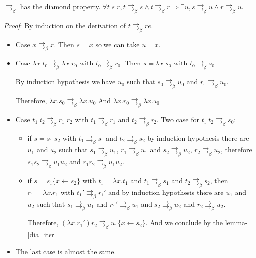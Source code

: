   \lemma $\rightrightarrows_\beta$ has the diamond property.
    $\forall t\; s\; r, t \rightrightarrows_\beta s \wedge t \rightrightarrows_\beta
    r \Rightarrow \exists u, s \rightrightarrows_\beta u \wedge r
    \rightrightarrows_\beta u$.

  \textit{Proof}: By induction on the derivation of $t\rightrightarrows_\beta
  re$.

  \begin{itemize}
    \item Case $x \rightrightarrows_\beta x$. Then $s = x$ so we can take $u =
      x$.

    \item Case $\lambda x.t_0 \rightrightarrows_\beta \lambda x. r_0$ with
      $t_0 \rightrightarrows_\beta r_0$. Then $s = \lambda x. s_0$ with
      $t_0 \rightrightarrows_\beta s_0$.

      By induction hypothesis we have $u_0$ such that $s_0
      \rightrightarrows_\beta u_0$ and $r_0 \rightrightarrows_\beta u_0$.

      Therefore, $\lambda x. s_0 \rightrightarrows_\beta \lambda x. u_0$ And
      $\lambda x. r_0 \rightrightarrows_\beta \lambda x. u_0$

    \item Case $t_1\;t_2 \rightrightarrows_\beta r_1\; r_2$ with $t_1
      \rightrightarrows_\beta r_1$ and $t_2 \rightrightarrows_\beta r_2$.
      Two case for $t_1\;t_2 \rightrightarrows_\beta s_0$:

      \begin{itemize}
        \item if $s = s_1\;s_2$ with $t_1 \rightrightarrows_\beta s_1$ and $t_2
          \rightrightarrows_\beta s_2$ by induction hypothesis there are $u_1$
          and $u_2$ such that $s_1 \rightrightarrows_\beta u_1$, $r_1
          \rightrightarrows_\beta u_1$ and $s_2 \rightrightarrows_\beta u_2$,
          $r_2 \rightrightarrows_\beta u_2$, therefore $s_1s_2
          \rightrightarrows_\beta u_1u_2$ and $r_1r_2
          \rightrightarrows_\beta u_1u_2$.

        \item if $s = s_1\{x \leftarrow s_2\}$ with $t_1 = \lambda x.t_1$ and
          $t_1 \rightrightarrows_\beta s_1$ and $t_2 \rightrightarrows_\beta
          s_2$, then $r_1 = \lambda x.r_1$ with $t_1' \rightrightarrows_\beta
          r_1'$ and by induction hypothesis there are $u_1$ and $u_2$ such that
          $s_1 \rightrightarrows_\beta u_1$ and $r_1'\rightrightarrows_\beta
          u_1$ and $s_2 \rightrightarrows_\beta u_2$ and $r_2
          \rightrightarrows_\beta u_2$.

          Therefore, $(\lambda x.r_1')r_2 \rightrightarrows_\beta u_1\{
            x \leftarrow s_2\}$. And we conclude by the lemma-\ref{dia_iter}
      \end{itemize}

    \item The last case is almost the same.
  \end{itemize}
  \qedsymbol

